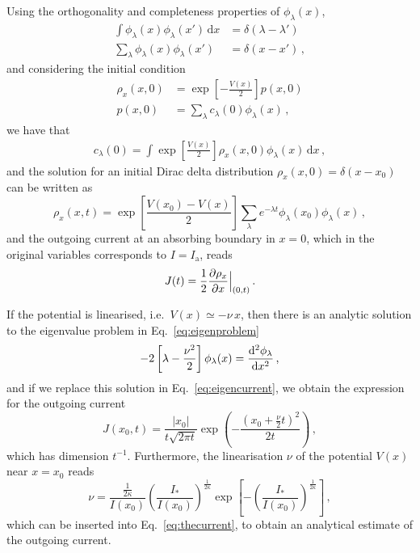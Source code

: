 {\begin{chapterappendices}
Using the orthogonality and completeness properties of $\phi_\lambda(x)$,
\begin{align}
    \int \phi_\lambda(x)\phi_\lambda(x')\,\mathrm{d}x &= \delta(\lambda - \lambda')\\
    \sum_\lambda \phi_\lambda(x)\phi_\lambda(x') &= \delta(x-x')\,,
\end{align}
and considering the initial condition
\begin{align}
    \rho_x(x,0) &= \exp\left[-\frac{V(x)}{2}\right] p(x,0) \\
    p(x,0) &= \sum_\lambda c_\lambda(0) \phi_\lambda(x)\,, \label{eq:mid_step_analytic}
\end{align}
we have that
\begin{align}
    c_\lambda(0) = \int \exp\left[\frac{V(x)}{2}\right] \rho_x(x,0)\phi_\lambda(x)\, \mathrm{d}x\,,
    \label{eq:c_lambda_zero}
\end{align}
and the solution for an initial Dirac delta distribution $\rho_x(x, 0)=\delta(x-x_0)$ can be written as
\begin{equation}
    \rho_x(x,t)=\exp\left[\frac{V(x_0)-V(x)}{2}\right]\sum_\lambda e^{-\lambda t}\phi_\lambda(x_0)\phi_\lambda(x)\, ,
\end{equation}
and the outgoing current at an absorbing boundary in $x=0$, which in the original variables corresponds to $I=I_\mathrm{a}$, reads
\begin{equation}
    J(t) = \frac{1}{2}\pdv{\rho_x}{x}\Bigr|_{(0,t)}     \, .
    \label{eq:eigencurrent}
\end{equation}

If the potential is linearised, i.e.\ $V(x)\simeq -\nu \, x$, then there is an analytic solution to the eigenvalue problem in Eq.~\eqref{eq:eigenproblem}
\begin{equation}
    -2\left[\lambda-\frac{\nu^2}{2}\right]\phi_\lambda(x)=\dv[2]{\phi_\lambda}{x}\, ,
\end{equation}
and if we replace this solution in Eq.~\eqref{eq:eigencurrent}, we obtain the expression for the outgoing current
\begin{equation}
    J(x_0, t) = \frac{|x_0|}{t\sqrt{2\pi t}}\exp\left(-\frac{(x_0+\frac{\nu}{2}t)^2}{2t}\right) \,,
    \label{eq:out_current}
\end{equation}
which has dimension $t^{-1}$. Furthermore, the linearisation $\nu$ of the potential $V(x)$ near $x=x_0$ reads
\begin{equation}
    \nu=\frac{\frac{1}{2\kappa}}{I(x_0)}\left(\frac{I_\ast}{I(x_0)}\right)^{\frac{1}{2\kappa}}\exp\left[-\left(\frac{I_\ast}{I(x_0)}\right)^{\frac{1}{2\kappa}}\right]\,,
\end{equation}
which can be inserted into Eq.~\eqref{eq:thecurrent}, to obtain an analytical estimate of the outgoing current.


\end{chapterappendices}}
